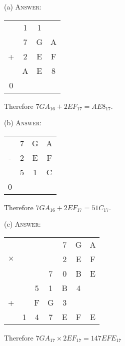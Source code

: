 
(a)
\textsc{Answer:}\vspace{-2mm}
\begin{answerlong}
    \begin{longtable}{cccc}
        & 1 & 1 &   \\
        & 7 & G & A \\
      + & 2 & E & F \\\hline
        & A & E & 8 \\\hline0
      \end{longtable}
      Therefore $7GA_{16} + 2EF_{17} = AE8_{17}$.
\end{answerlong}
  
(b)
\textsc{Answer:}\vspace{-2mm}
\begin{answerlong}
    \begin{longtable}{cccc}
        & 7 & G & A \\
      - & 2 & E & F \\\hline
        & 5 & 1 & C \\\hline0
      \end{longtable}
      Therefore $7GA_{16} + 2EF_{17} = 51C_{17}$.
\end{answerlong}

(c)
\textsc{Answer:}\vspace{-2mm}
\begin{answerlong}
    \begin{longtable}{ccccccc}
            &   &   &   & 7 & G & A \\
$\times$    &   &   &   & 2 & E & F \\ \hline
            &   &   & 7 & 0 & B & E \\
            &   & 5 & 1 & B & 4 &   \\
+           &   & F & G & 3 &   &   \\ \hline
            & 1 & 4 & 7 & E & F & E \\ \hline
\end{longtable}
Therefore $7GA_{17} \times 2EF_{17} = 147EFE_{17}$
\end{answerlong}
